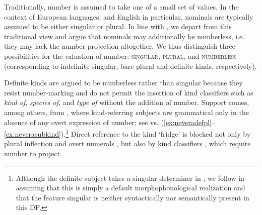 \documentclass[output=paper]{langscibook}
\begin{document}
Traditionally, number is assumed to take one of a small set of values. In the context of European languages, and English in particular, nominals are typically assumed to be either singular or plural. In line with \citet{Borik.Espinal2012, Borik.Espinal2015}, we depart from this traditional view and argue that nominals may additionally be numberless, i.e. they may lack the number projection altogether. We thus distinguish three possibilities for the valuation of number: \textsc{singular}, \textsc{plural}, and \textsc{numberless} (corresponding to indefinite singular, bare plural and definite kinds, respectively).

Definite kinds are argued to be numberless rather than singular because they resist number-marking and do not permit the insertion of kind classifiers such as \textit{kind of}, \textit{species of}, and \textit{type of} without the addition of number. Support comes, among others, from , where kind-referring subjects are grammatical only in the absence of any overt expression of number; see  vs. (\ref{ex:neveradefpl}--\ref{ex:neverasubkind}).\footnote{Although the definite subject takes a singular determiner in , we follow \citeauthor{Borik.Espinal2012} in assuming that this is simply a default morphophonological realization and that the feature singular is neither syntactically nor semantically present in this DP.}
Direct reference to the kind `fridge' is blocked not only by plural inflection and overt numerals , but also by kind classifiers , which require number to project.

\ea \label{ex:nevera}
\label{ex:neveradefsg}


\z \z
\end{document}
